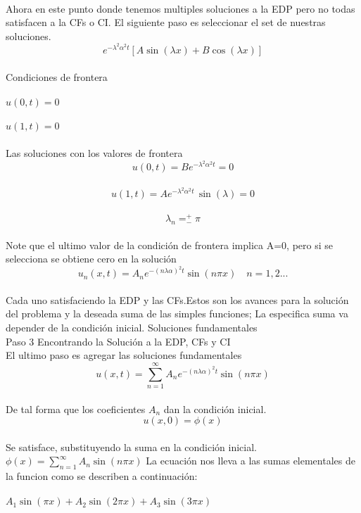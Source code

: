 \documentclass[10pt,a4paper]{report}
\begin{document}
\\ Ahora en este punto donde tenemos multiples soluciones a la EDP pero no todas satisfacen a la CFs o CI. El siguiente paso es seleccionar el set de nuestras soluciones.
\\ $$e^{-\lambda^2 \alpha^2 t} [A \sin(\lambda x)+ B \cos(\lambda x)]$$
\\ Condiciones de frontera
\\\\ $u(0,t)=0$
\\\\ $u(1,t)=0$
\\\\ Las soluciones con los valores de frontera
\\ $$u(0,t)=Be^{-\lambda^2 \alpha^2 t}=0$$
\\ $$u(1,t)=Ae^{-\lambda^2 \alpha^2 t} \, \sin(\lambda)=0$$
\\ $$\displaystyle\lambda_n = ^+_-\pi$$
\\ Note que el ultimo valor de la condición de frontera implica A=0, pero si se selecciona se obtiene cero en la solución
\\ $$u_n (x,t)= A_n e^{-(n \lambda \alpha)^2 t} \sin(n\pi x) \quad n=1,2...$$
\\ Cada uno satisfaciendo la EDP y las CFs.Estos son los avances para la solución del problema y la deseada suma de las simples funciones; La especifica suma va depender de la condición inicial. Soluciones fundamentales
\\ Paso 3 Encontrando la Solución a la EDP, CFs y CI
\\ El ultimo paso es agregar las soluciones fundamentales
\\ $$\displaystyle u(x,t)= \sum_{n=1}^\infty A_n e^{-(n \lambda \alpha)^2 t}
\sin(n \pi x)$$
\\ De tal forma que los coeficientes $A_n$ dan la condición inicial.
\\ $$u(x,0)=\phi(x)$$
\\ Se satisface, substituyendo la suma en la condición inicial.
$\displaystyle \phi(x)= \sum_{n=1}^\infty A_n \sin(n \pi x)$
\newpage
La ecuación nos lleva a las sumas elementales de la funcion como se describen a continuación:
\\\\ $\displaystyle A_1 \sin(\pi x) + A_2 \sin(2 \pi x) + A_3 \sin(3 \pi x)$
\end{document}
